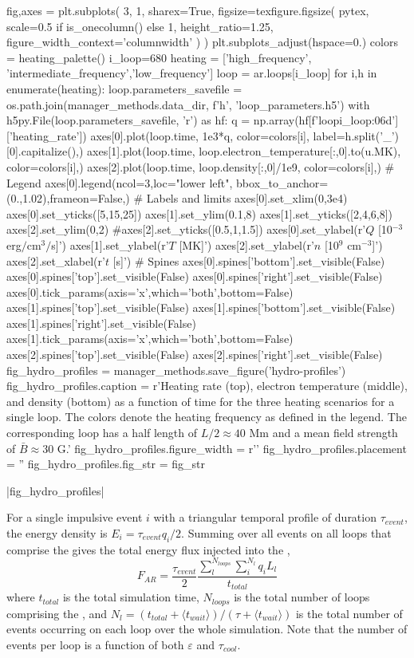 \begin{pycode}
fig,axes = plt.subplots(
    3, 1, sharex=True,
    figsize=texfigure.figsize(
        pytex,
        scale=0.5 if is_onecolumn() else 1,
        height_ratio=1.25,
        figure_width_context='columnwidth'
    )
)
plt.subplots_adjust(hspace=0.)
colors = heating_palette()
i_loop=680
heating = ['high_frequency', 'intermediate_frequency','low_frequency']
loop = ar.loops[i_loop]
for i,h in enumerate(heating):
    loop.parameters_savefile = os.path.join(manager_methods.data_dir, f'{h}', 'loop_parameters.h5')
    with h5py.File(loop.parameters_savefile, 'r') as hf:
        q = np.array(hf[f'loop{i_loop:06d}']['heating_rate'])
    axes[0].plot(loop.time, 1e3*q, color=colors[i], label=h.split('_')[0].capitalize(),)
    axes[1].plot(loop.time, loop.electron_temperature[:,0].to(u.MK), color=colors[i],)
    axes[2].plot(loop.time, loop.density[:,0]/1e9, color=colors[i],)
# Legend
axes[0].legend(ncol=3,loc="lower left", bbox_to_anchor=(0.,1.02),frameon=False,)
# Labels and limits
axes[0].set_xlim(0,3e4)
axes[0].set_yticks([5,15,25])
axes[1].set_ylim(0.1,8)
axes[1].set_yticks([2,4,6,8])
axes[2].set_ylim(0,2)
#axes[2].set_yticks([0.5,1,1.5])
axes[0].set_ylabel(r'$Q$ [10$^{-3}$ erg$/$cm$^{3}$$/$s]')
axes[1].set_ylabel(r'$T$ [MK]')
axes[2].set_ylabel(r'$n$ [10$^9$ cm$^{-3}$]')
axes[2].set_xlabel(r'$t$ [s]')
# Spines
axes[0].spines['bottom'].set_visible(False)
axes[0].spines['top'].set_visible(False)
axes[0].spines['right'].set_visible(False)
axes[0].tick_params(axis='x',which='both',bottom=False)
axes[1].spines['top'].set_visible(False)
axes[1].spines['bottom'].set_visible(False)
axes[1].spines['right'].set_visible(False)
axes[1].tick_params(axis='x',which='both',bottom=False)
axes[2].spines['top'].set_visible(False)
axes[2].spines['right'].set_visible(False)
fig_hydro_profiles = manager_methods.save_figure('hydro-profiles')
fig_hydro_profiles.caption = r'Heating rate (top), electron temperature (middle), and density (bottom) as a function of time for the three heating scenarios for a single loop. The colors denote the heating frequency as defined in the legend. The corresponding loop has a half length of $L/2\approx40$ Mm and a mean field strength of $\bar{B}\approx30$ G.'
fig_hydro_profiles.figure_width = r'\columnwidth'
fig_hydro_profiles.placement = ''
fig_hydro_profiles.fig_str = fig_str
\end{pycode}
|fig_hydro_profiles|

For a single impulsive event $i$ with a triangular temporal profile of duration $\tau_{event}$, the energy density is $E_i=\tau_{event} q_i/2$. Summing over all events on all loops that comprise the \AR{} gives the total energy flux injected into the \AR{},
\begin{equation}
    F_{AR} = \frac{\tau_{event}}{2}\frac{\sum_l^{N_{loops}}\sum_i^{N_l} q_iL_l}{t_{total}}
\end{equation}
where $t_{total}$ is the total simulation time, $N_{loops}$ is the total number of loops comprising the \AR{}, and $N_l=(t_{total} + \langle t_{wait}\rangle)/(\tau + \langle t_{wait}\rangle)$ is the total number of events occurring on each loop over the whole simulation. Note that the number of events per loop is a function of both $\varepsilon$ and $\tau_{cool}$.

